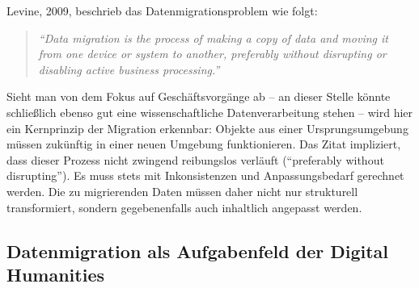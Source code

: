 \documentclass[a4paper,
fontsize=11pt,
oneside,
numbers=noperiodatend,
parskip=half-,
bibliography=totoc,
final
]{scrartcl}
\begin{document}
Levine, 2009, beschrieb das Datenmigrationsproblem wie folgt:

\begin{quote}
\emph{\enquote{Data migration is the process of making a copy of data
and moving it from one device or system to another, preferably without
disrupting or disabling active business processing.}}
\end{quote}

Sieht man von dem Fokus auf Geschäftsvorgänge ab -- an dieser Stelle
könnte schließlich ebenso gut eine wissenschaftliche Datenverarbeitung
stehen -- wird hier ein Kernprinzip der Migration erkennbar: Objekte aus
einer Ursprungsumgebung müssen zukünftig in einer neuen Umgebung
funktionieren. Das Zitat impliziert, dass dieser Prozess nicht zwingend
reibungslos verläuft (\enquote{preferably without disrupting}). Es muss
stets mit Inkonsistenzen und Anpassungsbedarf gerechnet werden. Die zu
migrierenden Daten müssen daher nicht nur strukturell transformiert,
sondern gegebenenfalls auch inhaltlich angepasst werden.

\subsection*{Datenmigration als Aufgabenfeld der Digital
Humanities}\label{datenmigration-als-aufgabenfeld-der-digital-humanities}
\end{document}

